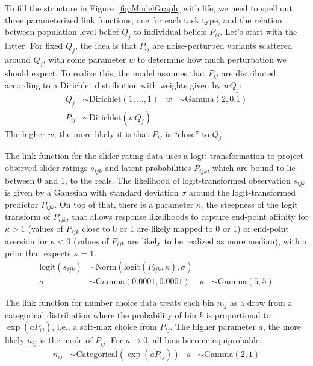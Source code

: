 \documentclass[10pt,letterpaper]{article}
\DeclareMathOperator{\expo}{exp}
\begin{document}
To fill the structure in Figure~\ref{fig:ModelGraph} with life, we need to spell out three
parameterized link functions, one for each task type, and the relation between population-level
belief $Q_j$ to individual beliefs $P_{ij}$. Let's start with the latter. For fixed $Q_j$, the
idea is that $P_{ij}$ are noise-perturbed variants scattered around $Q_j$, with some parameter
$w$ to determine how much perturbation we should expect. To realize this, the model assumes
that $P_{ij}$ are distributed according to a Dirichlet distribution with weights given by
$w Q_{j}$:
\begin{align*}
  Q_j & \sim \text{Dirichlet}(1, \dots, 1) & w & \sim \text{Gamma}(2,0.1) \\
  P_{ij} & \sim \text{Dirichlet}( w Q_j)
\end{align*}
The higher $w$, the more likely it is that $P_{ij}$ is ``close'' to $Q_j$.

The link function for the slider rating data uses a logit transformation to project observed
slider ratings $s_{ijk}$ and latent probabilities $P_{ijk}$, which are bound to lie between 0
and 1, to the reals. The likelihood of logit-transformed observation $s_{ijk}$ is given by a
Gaussian with standard deviation $\sigma$ around the logit-transformed predictor $P_{ijk}$. On
top of that, there is a parameter $\kappa$, the steepness of the logit transform of $P_{ijk}$,
that allows response likelihoods to capture end-point affinity for $\kappa >1$ (values of
$P_{ijk}$ close to 0 or 1 are likely mapped to 0 or 1) or end-point aversion for $\kappa <0$
(values of $P_{ijk}$ are likely to be realized as more median), with a prior that expects
$\kappa=1$.
\begin{align*}
  \text{logit}(s_{ijk}) &\sim
        \text{Norm}(\text{logit}(P_{ijk}, \kappa), \sigma) \\
        \sigma &  \sim \text{Gamma}(0.0001,0.0001) & \kappa &\sim \text{Gamma}(5,5)
\end{align*}
 
The link function for number choice data treats each bin $n_{ij}$ as a draw from a categorical
distribution where the probability of bin $k$ is proportional to $\expo(a P_{ij})$, i.e., a
soft-max choice from $P_{ij}$. The higher parameter $a$, the more likely $n_{ij}$ is the mode
of $P_{ij}$. For $a \rightarrow 0$, all bins become equiprobable.
\begin{align*}
  n_{ij} & \sim
        \text{Categorical}(\expo(a P_{ij})) &
 a & \sim \text{Gamma}(2,1)
\end{align*}
\end{document}
